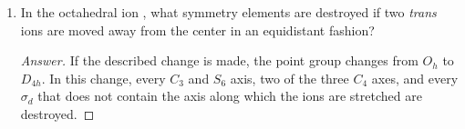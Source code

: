 \documentclass[../psets.tex]{subfiles}
\begin{document}
\begin{enumerate}[label={\Roman*)}]
\begin{enumerate}[label={\alph*)}]
        \begin{proof}[Answer]
            Not low or high symmetry. Has a $C_2$ axis. No perpendicular $C_2$ axes. No $\sigma_h$. Has two perpendicular $\sigma_v$ planes.\par
            Therefore,  is of the $C_{2v}$ point group.
        \end{proof}
    \end{enumerate}
    \newpage
    \item In the octahedral ion , what symmetry elements are destroyed if two \emph{trans}  ions are moved away from the  center in an equidistant fashion?
    \begin{proof}[Answer]
        If the described change is made, the point group changes from $O_h$ to $D_{4h}$. In this change, every $C_3$ and $S_6$ axis, two of the three $C_4$ axes, and every $\sigma_d$ that does not contain the axis along which the  ions are stretched are destroyed.
    \end{proof}
\end{enumerate}
\end{document}
